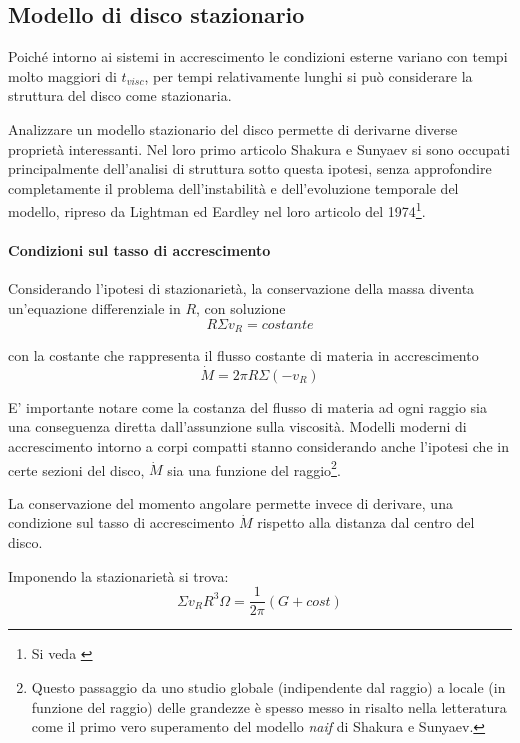 \documentclass[a4paperbi]{article}
\begin{document}
\subsection{Modello di disco stazionario}
	Poiché intorno ai sistemi in accrescimento le condizioni esterne variano con tempi molto maggiori di $t_{visc}$, per tempi relativamente lunghi si può considerare la struttura del disco come stazionaria.
	
	Analizzare un modello stazionario del disco permette di derivarne diverse proprietà interessanti. Nel loro primo articolo Shakura e Sunyaev si sono occupati principalmente dell'analisi di struttura sotto questa ipotesi, senza approfondire completamente il problema dell'instabilità e dell'evoluzione temporale del modello, ripreso da Lightman ed Eardley nel loro articolo del 1974\footnote{Si veda \cite{LightmanEardley1974}}.
	
	\paragraph{Condizioni sul tasso di accrescimento}
	Considerando l'ipotesi di stazionarietà, la conservazione della massa diventa un'equazione differenziale in $R$, con soluzione
	\begin{equation}
		R\Sigma v_R=costante
	\end{equation}
	
	con la costante che rappresenta il flusso costante di materia in accrescimento
	\begin{equation}
		\dot{M}=2\pi R\Sigma(-v_R)
	\end{equation}
	
	E' importante notare come la costanza del flusso di materia ad ogni raggio sia una conseguenza diretta dall'assunzione sulla viscosità. Modelli moderni di accrescimento intorno a corpi compatti stanno considerando anche l'ipotesi che in certe sezioni del disco, $\dot{M}$ sia una funzione del raggio\footnote{Questo passaggio da uno studio globale (indipendente dal raggio) a locale (in funzione del raggio) delle grandezze è spesso messo in risalto nella letteratura come il primo vero superamento del modello \textit{naif} di Shakura e Sunyaev.}.
	
	La conservazione del momento angolare permette invece di derivare, una condizione sul tasso di accrescimento $\dot{M}$ rispetto alla distanza dal centro del disco.
	
	Imponendo la stazionarietà si trova:
	\begin{equation}
		\Sigma v_RR^3\Omega=\frac{1}{2\pi}(G+cost)
	\end{equation}
	
\end{document}
